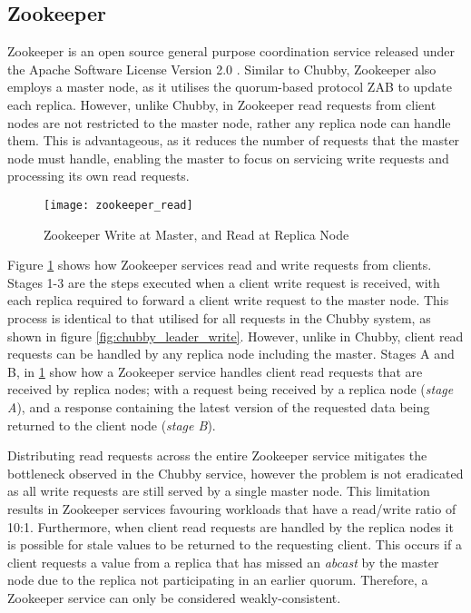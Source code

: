 	\subsection{Zookeeper}
	Zookeeper\citep{Hunt:2010:ZWC:1855840.1855851} is an open source general purpose coordination service released under the Apache Software License Version 2.0 \citep{ApacheLicense}. Similar to Chubby, Zookeeper also employs a master node, as it utilises the quorum-based protocol ZAB\citep{Junqueira:2011:ZHB:2056308.2056409} to update each replica.  However, unlike Chubby, in Zookeeper read requests from client nodes are not restricted to the master node, rather any replica node can handle them.  This is advantageous, as it reduces the number of requests that the master node must handle, enabling the master to focus on servicing write requests and processing its own read requests.  
	
\begin{figure}[htbp!] 
	    \centering    
	    \texttt{[image: zookeeper\_read]}
	    \caption[Zookeeper Read and Write Requests]{Zookeeper Write at Master, and Read at Replica Node}
	    \label{fig:zookeeper_read}
	\end{figure}	 	
	
    Figure \ref{fig:zookeeper_read} shows how Zookeeper services read and write requests from clients.  Stages 1-3 are the steps executed when a client write request is received, with each replica required to forward a client write request to the master node.  This process is identical to that utilised for all requests in the Chubby system, as shown in figure \ref{fig:chubby_leader_write}.  However, unlike in Chubby, client read requests can be handled by any replica node including the master.  Stages A and B, in \ref{fig:zookeeper_read} show how a Zookeeper service handles client read requests that are received by replica nodes; with a request being received by a replica node (\emph{stage A}), and a response containing the latest version of the requested data being returned to the client node (\emph{stage B}).  

	Distributing read requests across the entire Zookeeper service mitigates the bottleneck observed in the Chubby service, however the problem is not eradicated as all write requests are still served by a single master node.  This limitation results in Zookeeper services favouring workloads that have a read/write ratio of 10:1. Furthermore, when client read requests are handled by the replica nodes it is possible for stale values to be returned to the requesting client.  This occurs if a client requests a value from a replica that has missed an \emph{abcast} by the master node due to the replica not participating in an earlier quorum.  Therefore, a Zookeeper service can only be considered weakly-consistent.   

